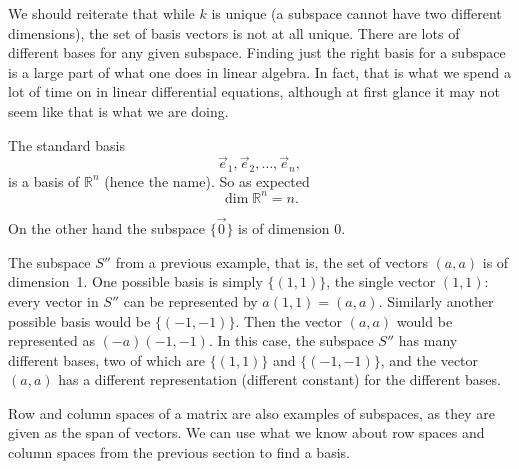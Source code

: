 
We should reiterate that while $k$ is unique (a subspace cannot have two different
dimensions), the set of basis vectors is not at all unique.  There are lots
of different bases for any given subspace.  Finding just the right basis for
a subspace is a large part of what one does in linear algebra.  In fact,
that is what we spend a lot of time on in
linear differential equations, although at first glance
it may not seem like that is what we are doing.

\begin{example}
The standard basis
\begin{equation*}
\vec{e}_1, \vec{e}_2, \ldots, \vec{e}_n ,
\end{equation*}
is a basis of ${\mathbb R}^n$ (hence the name).
So as expected
\begin{equation*}
\dim {\mathbb R}^n = n .
\end{equation*}

On the other hand the subspace $\{ \vec{0} \}$ is of dimension $0$.

The subspace $S''$ from a previous example, that is, the set of
vectors $(a,a)$ is of dimension~1.  One possible basis is simply
$\{ (1,1) \}$, the single
vector $(1,1)$: every vector in $S''$ can be represented by $a (1,1) =
(a,a)$.  Similarly another possible basis would be $\{ (-1,-1) \}$.  Then
the vector $(a,a)$ would be represented as $(-a) (-1,-1)$. In this case, the subspace $S''$ has many different bases, two of which are $\{(1,1)\}$ and $\{(-1,-1)\}$, and the vector $(a,a)$ has a different representation (different constant) for the different bases.
\end{example}

Row and column spaces of a matrix are also examples of
subspaces,
as they are given as the span of vectors.
We can use
what we know about row spaces and column spaces
from the previous section to find a basis.

